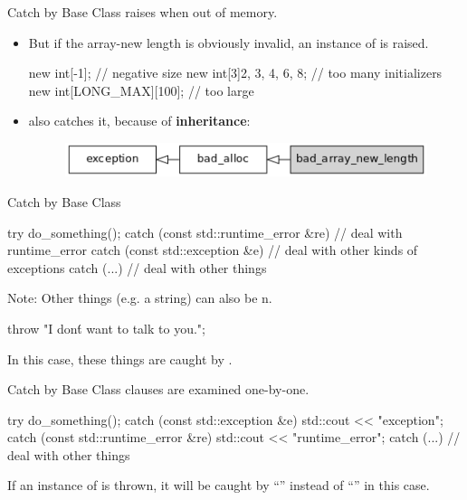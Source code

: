 \documentclass{beamer}
\begin{document}
\begin{frame}[fragile]{Catch by Base Class}
    \ttt{[]} raises  when out of memory.
    \begin{itemize}
        \item But if the array-new length is obviously invalid, an instance of  is raised.
        \begin{cpp}
new int[-1]; // negative size
new int[3]{2, 3, 4, 6, 8}; // too many initializers
new int[LONG_MAX][100]; // too large
        \end{cpp}
        \pause
        \item {}\ttt{(} also catches it, because of \textbf{inheritance}:
        \begin{figure}[h]
            \centering
            \includegraphics[scale=0.7]{img/bad_array_new_length-inheritance.png}
        \end{figure}
    \end{itemize}
\end{frame}

\begin{frame}[fragile]{Catch by Base Class}
    \begin{cpp}
try {
  do_something();
} catch (const std::runtime_error &re) {
  // deal with runtime_error
} catch (const std::exception &e) {
  // deal with other kinds of exceptions
} catch (...) {
  // deal with other things
}
    \end{cpp}
    \pause
    Note: Other things (e.g. a string) can also be n.
    \begin{cpp}
throw "I don\'t want to talk to you.";
    \end{cpp}
    In this case, these things are caught by .
\end{frame}

\begin{frame}[fragile]{Catch by Base Class}
     clauses are examined one-by-one.
    \begin{cpp}
try {
  do_something();
} catch (const std::exception &e) {
  std::cout << "exception\n";
} catch (const std::runtime_error &re) {
  std::cout << "runtime_error\n";
} catch (...) {
  // deal with other things
}
    \end{cpp}
    If an instance of  is thrown, it will be caught by ``'' instead of ``'' in this case.
\end{frame}
\end{document}
